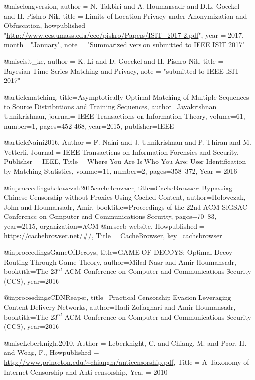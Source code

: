 {{{{{	
	@misc{longversion,
	author = {N. Takbiri and A. Houmansadr and D.L. Goeckel and H. Pishro-Nik},
	title = {{Limits of Location Privacy under Anonymization and Obfuscation}},
	howpublished = "\url{http://www.ecs.umass.edu/ece/pishro/Papers/ISIT_2017-2.pdf}",
	year = 2017,
	month= "January",
	note = "Summarized version submitted to IEEE ISIT 2017"
	}
	
	@misc{isit_ke,
	author = {K. Li and D. Goeckel and H. Pishro-Nik},
	title = {{Bayesian Time Series Matching and Privacy}},
	note = "submitted to IEEE ISIT 2017"
	}
	
	@article{matching,
	title={Asymptotically Optimal Matching of Multiple Sequences to Source Distributions and Training Sequences},
	author={Jayakrishnan Unnikrishnan},
	journal={ IEEE Transactions on Information Theory},
	volume={61},
	number={1},
	pages={452-468},
	year={2015},
	publisher={IEEE}
	}
	
	
	@article{Naini2016,
	Author = {F. Naini and J. Unnikrishnan and P. Thiran and M. Vetterli},
	Journal = {IEEE Transactions on Information Forensics and Security},
	Publisher = {IEEE},
	Title = {Where You Are Is Who You Are: User Identification by Matching Statistics},
	volume={11},
	number={2},
	pages={358--372},
	Year = {2016}
	}
	
	
	
	@inproceedings{holowczak2015cachebrowser,
	title={{CacheBrowser: Bypassing Chinese Censorship without Proxies Using Cached Content}},
	author={Holowczak, John and Houmansadr, Amir},
	booktitle={Proceedings of the 22nd ACM SIGSAC Conference on Computer and Communications Security},
	pages={70--83},
	year={2015},
	organization={ACM}
	}
	@misc{cb-website,
	Howpublished = {\url{https://cachebrowser.net/#/}},
	Title = {{CacheBrowser}},
	key={cachebrowser}
	}
	
	@inproceedings{GameOfDecoys,
	title={{GAME OF DECOYS: Optimal Decoy Routing Through Game Theory}},
	author={Milad Nasr and Amir Houmansadr},
	booktitle={The $23^{rd}$ ACM Conference on Computer and Communications Security (CCS)},
	year={2016}
	}
	
	@inproceedings{CDNReaper,
	title={{Practical Censorship Evasion Leveraging Content Delivery Networks}},
	author={Hadi Zolfaghari and Amir Houmansadr},
	booktitle={The $23^{rd}$ ACM Conference on Computer and Communications Security (CCS)},
	year={2016}
	}
	
	@misc{Leberknight2010,
	Author = {Leberknight, C. and Chiang, M. and Poor, H. and Wong, F.},
	Howpublished = {\url{http://www.princeton.edu/~chiangm/anticensorship.pdf}},
	Title = {{A Taxonomy of Internet Censorship and Anti-censorship}},
	Year = {2010}}
	
}}}}}
